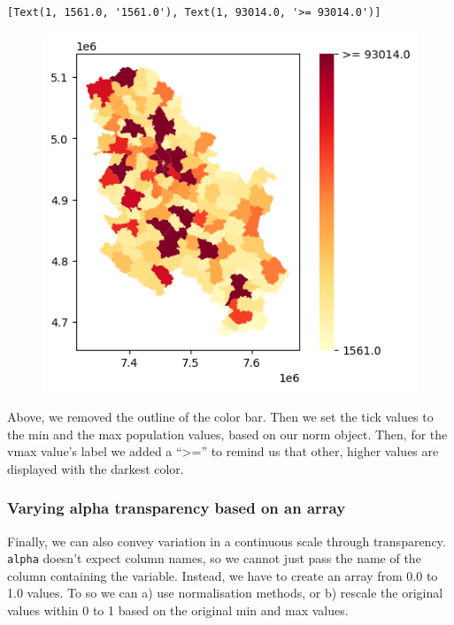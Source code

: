 \documentclass[
  letterpaper,
  DIV=11,
  numbers=noendperiod]{scrreprt}
\begin{document}
\begin{verbatim}
[Text(1, 1561.0, '1561.0'), Text(1, 93014.0, '>= 93014.0')]
\end{verbatim}

\begin{figure}[H]

{\centering \includegraphics{labs/w02_maps_files/figure-pdf/cell-39-output-2.png}

}

\end{figure}

Above, we removed the outline of the color bar. Then we set the tick
values to the min and the max population values, based on our norm
object. Then, for the vmax value's label we added a ``\textgreater='' to
remind us that other, higher values are displayed with the darkest
color.

\hypertarget{varying-alpha-transparency-based-on-an-array}{%
\subsubsection{Varying alpha transparency based on an
array}\label{varying-alpha-transparency-based-on-an-array}}

Finally, we can also convey variation in a continuous scale through
transparency. \texttt{alpha} doesn't expect column names, so we cannot
just pass the name of the column containing the variable. Instead, we
have to create an array from 0.0 to 1.0 values. To so we can a) use
normalisation methods, or b) rescale the original values within 0 to 1
based on the original min and max values.
\end{document}

